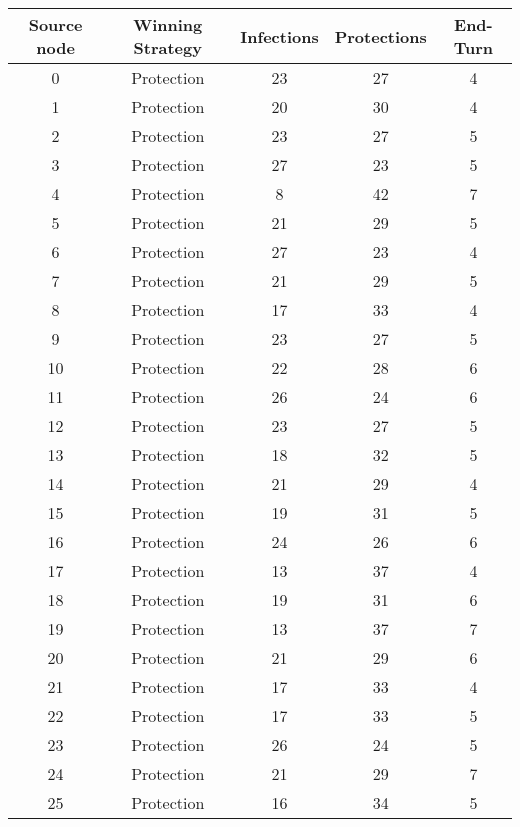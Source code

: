 \documentclass[results.tex]{subfiles}
\begin{document}
\begin{center}
  \begin{tabular}{| c || c | c | c | c |}
    \hline
    {\bfseries Source node} & {\bfseries Winning Strategy} & {\bfseries Infections} & {\bfseries Protections} & {\bfseries End-Turn} \\  %
    \hline\hline
    0 & Protection & 23 & 27 & 4 \\ 
    \hline
    1 & Protection & 20 & 30 & 4 \\ 
    \hline
    2 & Protection & 23 & 27 & 5 \\ 
    \hline
    3 & Protection & 27 & 23 & 5 \\ 
    \hline
    4 & Protection & 8 & 42 & 7 \\ 
    \hline
    5 & Protection & 21 & 29 & 5 \\ 
    \hline
    6 & Protection & 27 & 23 & 4 \\ 
    \hline
    7 & Protection & 21 & 29 & 5 \\ 
    \hline
    8 & Protection & 17 & 33 & 4 \\ 
    \hline
    9 & Protection & 23 & 27 & 5 \\ 
    \hline
    10 & Protection & 22 & 28 & 6 \\ 
    \hline
    11 & Protection & 26 & 24 & 6 \\ 
    \hline
    12 & Protection & 23 & 27 & 5 \\ 
    \hline
    13 & Protection & 18 & 32 & 5 \\ 
    \hline
    14 & Protection & 21 & 29 & 4 \\ 
    \hline
    15 & Protection & 19 & 31 & 5 \\ 
    \hline
    16 & Protection & 24 & 26 & 6 \\ 
    \hline
    17 & Protection & 13 & 37 & 4 \\ 
    \hline
    18 & Protection & 19 & 31 & 6 \\ 
    \hline
    19 & Protection & 13 & 37 & 7 \\ 
    \hline
    20 & Protection & 21 & 29 & 6 \\ 
    \hline
    21 & Protection & 17 & 33 & 4 \\ 
    \hline
    22 & Protection & 17 & 33 & 5 \\ 
    \hline
    23 & Protection & 26 & 24 & 5 \\ 
    \hline
    24 & Protection & 21 & 29 & 7 \\ 
    \hline
    25 & Protection & 16 & 34 & 5 \\ 

\end{tabular}
\end{center}
\end{document}
